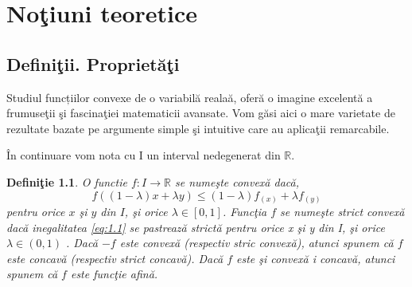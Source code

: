 \documentclass[a4paper,12pt,oneside]{report}
\newtheorem{definition}{Defini\c tie}
\begin{document}
\maketitle

\tableofcontents

%
%
%
%
\chapter{No\c{t}iuni teoretice}

\section{Defini\c{t}ii. Propriet\u{a}\c{t}i}

Studiul funcțiilor convexe de o variabil\u {a} reala\u {a}, ofer\u{a} o imagine excelent\u {a} a frumuse\c {t}ii \c{s}i fascina\c{t}iei matematicii avansate. Vom g\u{a}si aici o mare varietate de rezultate bazate pe argumente simple \c{s}i intuitive care au aplica\c{t}ii remarcabile.

\^{I}n continuare vom nota cu I un interval nedegenerat din \(\mathbb{R}\).

\begin{definition}

O functie \(f: I \rightarrow \mathbb{R}\) se nume\c{s}te convex\u{a} dac\u{a},
\begin{displaymath}
f \left ( \left ( 1 - \lambda  \right )x + \lambda y \right )\leq \left ( 1 - \lambda  \right ) f_{\left ( x \right )} + \lambda f_{\left ( y \right )} 	\label{eq:1.1} \tag{1.1}
\end{displaymath}
pentru orice \(x\) \c{s}i \(y\) din \(I\), \c{s}i orice \(\lambda \in \left [ 0,1 \right ]\). Func\c{t}ia \(f\) se nume\c{s}te strict convex\u{a} dac\u{a} inegalitatea \ref{eq:1.1} se pastreaz\u{a}  strict\u{a} pentru orice x \c{s}i y din I, \c{s}i orice  \(\lambda \in \left ( 0,1 \right )\) . Dac\u{a} \(-f\) este convex\u{a} (respectiv stric convex\u{a}), atunci spunem c\u{a} \(f\) este concav\u{a} (respectiv strict concav\u{a}). Dac\u{a} \(f\) este \c{s}i convex\u{a} i concav\u{a}, atunci spunem c\u{a} \(f\) este func\c{t}ie afin\u{a}.
\end{definition}
\end{document}
